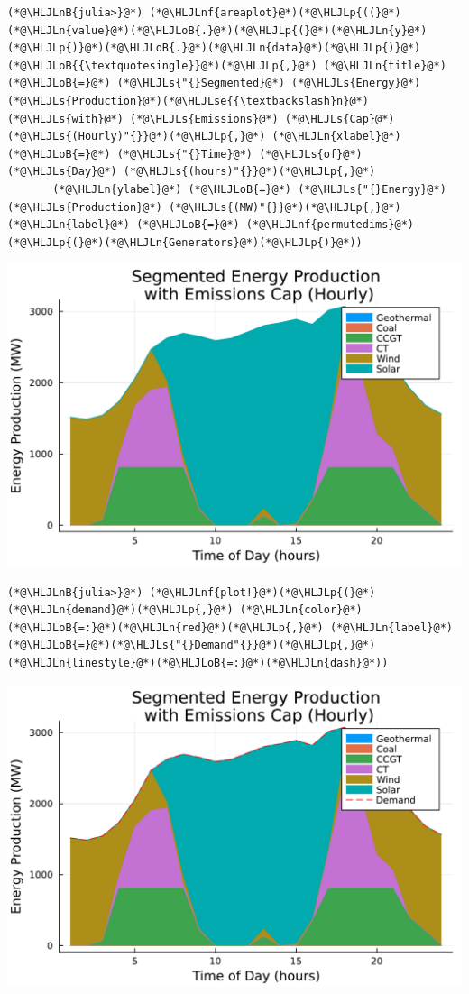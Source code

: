 \documentclass[12pt,a4paper]{article}
\newcommand{\HLJLn}[1]{#1}
\newcommand{\HLJLnf}[1]{\textcolor[RGB]{66,102,213}{#1}}
\newcommand{\HLJLs}[1]{\textcolor[RGB]{201,61,57}{#1}}
\newcommand{\HLJLse}[1]{\textcolor[RGB]{59,151,46}{#1}}
\newcommand{\HLJLnB}[1]{\textcolor[RGB]{59,151,46}{#1}}
\newcommand{\HLJLoB}[1]{\textcolor[RGB]{102,102,102}{\textbf{#1}}}
\newcommand{\HLJLp}[1]{#1}
\begin{document}
\begin{lstlisting}
(*@\HLJLnB{julia>}@*) (*@\HLJLnf{areaplot}@*)(*@\HLJLp{((}@*)(*@\HLJLn{value}@*)(*@\HLJLoB{.}@*)(*@\HLJLp{(}@*)(*@\HLJLn{y}@*)(*@\HLJLp{)}@*)(*@\HLJLoB{.}@*)(*@\HLJLn{data}@*)(*@\HLJLp{)}@*)(*@\HLJLoB{{\textquotesingle}}@*)(*@\HLJLp{,}@*) (*@\HLJLn{title}@*) (*@\HLJLoB{=}@*) (*@\HLJLs{"{}Segmented}@*) (*@\HLJLs{Energy}@*) (*@\HLJLs{Production}@*)(*@\HLJLse{{\textbackslash}n}@*) (*@\HLJLs{with}@*) (*@\HLJLs{Emissions}@*) (*@\HLJLs{Cap}@*) (*@\HLJLs{(Hourly)"{}}@*)(*@\HLJLp{,}@*) (*@\HLJLn{xlabel}@*) (*@\HLJLoB{=}@*) (*@\HLJLs{"{}Time}@*) (*@\HLJLs{of}@*) (*@\HLJLs{Day}@*) (*@\HLJLs{(hours)"{}}@*)(*@\HLJLp{,}@*)
       (*@\HLJLn{ylabel}@*) (*@\HLJLoB{=}@*) (*@\HLJLs{"{}Energy}@*) (*@\HLJLs{Production}@*) (*@\HLJLs{(MW)"{}}@*)(*@\HLJLp{,}@*) (*@\HLJLn{label}@*) (*@\HLJLoB{=}@*) (*@\HLJLnf{permutedims}@*)(*@\HLJLp{(}@*)(*@\HLJLn{Generators}@*)(*@\HLJLp{)}@*))
\end{lstlisting}
\includegraphics[width=\linewidth]{figures/solution-template_9_2.pdf}

\begin{lstlisting}
(*@\HLJLnB{julia>}@*) (*@\HLJLnf{plot!}@*)(*@\HLJLp{(}@*)(*@\HLJLn{demand}@*)(*@\HLJLp{,}@*) (*@\HLJLn{color}@*)(*@\HLJLoB{=:}@*)(*@\HLJLn{red}@*)(*@\HLJLp{,}@*) (*@\HLJLn{label}@*)(*@\HLJLoB{=}@*)(*@\HLJLs{"{}Demand"{}}@*)(*@\HLJLp{,}@*) (*@\HLJLn{linestyle}@*)(*@\HLJLoB{=:}@*)(*@\HLJLn{dash}@*))
\end{lstlisting}
\includegraphics[width=\linewidth]{figures/solution-template_9_3.pdf}
\end{document}
